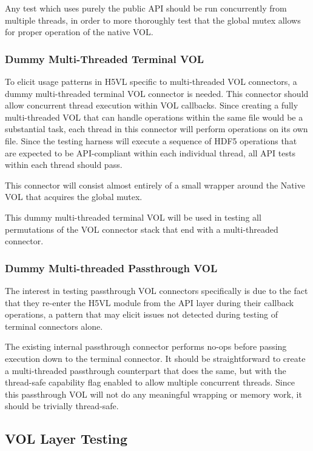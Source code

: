\documentclass{article}
\begin{document}
Any test which uses purely the public API should be run concurrently from multiple threads, in order to more thoroughly test that the global mutex allows for proper operation of the native VOL.

\subsubsection{Dummy Multi-Threaded Terminal VOL}
To elicit usage patterns in H5VL specific to multi-threaded VOL connectors, a dummy multi-threaded terminal VOL connector is needed. This connector should allow concurrent thread execution within VOL callbacks. 
Since creating a fully multi-threaded VOL that can handle operations within the same file would be a substantial task, each thread in this connector will perform operations on its own file. Since the testing harness will execute a sequence of HDF5 operations that are expected to be API-compliant within each individual thread, all API tests within each thread should pass. 

This connector will consist almost entirely of a small wrapper around the Native VOL that acquires the global mutex.

This dummy multi-threaded terminal VOL will be used in testing all permutations of the VOL connector stack that end with a multi-threaded connector. 

\subsubsection{Dummy Multi-threaded Passthrough VOL}

The interest in testing passthrough VOL connectors specifically is due to the fact that they re-enter the H5VL module from the API layer during their callback operations, a pattern that may elicit issues not detected during testing of terminal connectors alone.

The existing internal passthrough connector performs no-ops before passing execution down to the terminal connector. It should be straightforward to create a multi-threaded passthrough counterpart that does the same, but with the thread-safe capability flag enabled to allow multiple concurrent threads. Since this passthrough VOL will not do any meaningful wrapping or memory work, it should be trivially thread-safe.

\subsection{VOL Layer Testing}
\label{sec:vol-layer-testing}
\end{document}

